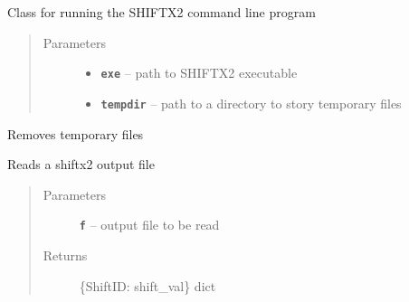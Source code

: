 \documentclass[letterpaper,10pt,english]{sphinxmanual}
\begin{document}

\begin{fulllineitems}
\label{modules:readutil.RunShiftX}
Class for running the SHIFTX2 command line program
\begin{quote}\begin{description}
\item[{Parameters}] \leavevmode\begin{itemize}
\item {} 
\textbf{\texttt{exe}} -- path to SHIFTX2 executable

\item {} 
\textbf{\texttt{tempdir}} -- path to a directory to story temporary files

\end{itemize}

\end{description}\end{quote}

\begin{fulllineitems}
\label{modules:readutil.RunShiftX._clean}
Removes temporary files

\end{fulllineitems}


\begin{fulllineitems}
\label{modules:readutil.RunShiftX.read_ouput}
Reads a shiftx2 output file
\begin{quote}\begin{description}
\item[{Parameters}] \leavevmode
\textbf{\texttt{f}} -- output file to be read

\item[{Returns}] \leavevmode
\{ShiftID: shift\_val\} dict

\end{description}\end{quote}

\end{fulllineitems}



\end{fulllineitems}
\end{document}
